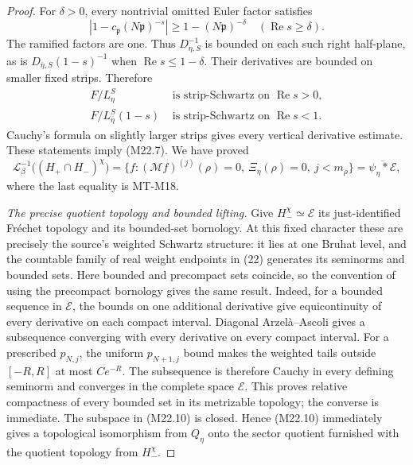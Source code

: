 \begin{proof}
For \(\delta>0\), every nontrivial omitted
Euler factor satisfies
\[
 |1-c_{\mathfrak p}(N\mathfrak p)^{-s}|
                         \ge1-(N\mathfrak p)^{-\delta}
       \quad(\operatorname{Re}s\ge\delta).
\]
The ramified factors are one.
Thus \(D_{\eta,S}^{-1}\) is bounded on each
such right half-plane, as is
\(D_{\bar\eta,S}(1-s)^{-1}\) when
\(\operatorname{Re}s\le1-\delta\).
Their derivatives are bounded on smaller
fixed strips.  Therefore
\[
 \begin{split}
 F/L_\eta^S&\text{ is strip-Schwartz on }\operatorname{Re}s>0,\\
 F/L_{\bar\eta}^S(1-s)&\text{ is strip-Schwartz on }
                                      \operatorname{Re}s<1.
 \end{split}                                                    \tag{M22.9}
\]
Cauchy's formula on slightly larger strips
gives every vertical derivative estimate.
These statements imply (M22.7).
We have proved
\[
 \mathcal L_\beta^{-1}\bigl((H_+\cap H_-)^\chi\bigr)
   =\{f:(\mathcal Mf)^{(j)}(\rho)=0,\
          \Xi_\eta(\rho)=0,\ j<m_\rho\}
   =\overline{\psi_\eta*\mathcal E},                             \tag{M22.10}
\]
where the last equality is MT-M18.

\emph{The precise quotient topology and bounded lifting.}
Give \(H_-^\chi\simeq\mathcal E\) its
just-identified Fr\'echet topology and its
bounded-set bornology.  At this fixed character
these are precisely the source's weighted
Schwartz structure: it lies at one Bruhat
level, and the countable family of real
weight endpoints in (22) generates its
seminorms and bounded sets.
Here bounded and precompact sets coincide,
so the convention of using the precompact
bornology gives the same result.  Indeed,
for a bounded sequence in \(\mathcal E\),
the bounds on one additional derivative
give equicontinuity of every derivative
on each compact interval.  Diagonal
Arzel\`a--Ascoli gives a subsequence
converging with every derivative on every
compact interval.  For a prescribed
\(p_{N,j}\), the uniform \(p_{N+1,j}\)
bound makes the weighted tails outside
\([-R,R]\) at most \(Ce^{-R}\).
The subsequence is therefore Cauchy in
every defining seminorm and converges
in the complete space \(\mathcal E\).
This proves relative compactness of every
bounded set in its metrizable topology;
the converse is immediate.
The subspace in (M22.10) is closed.
Hence (M22.10) immediately gives a
topological isomorphism from \(Q_\eta\)
onto the sector quotient furnished with
the quotient topology from \(H_-^\chi\).


\end{proof}
